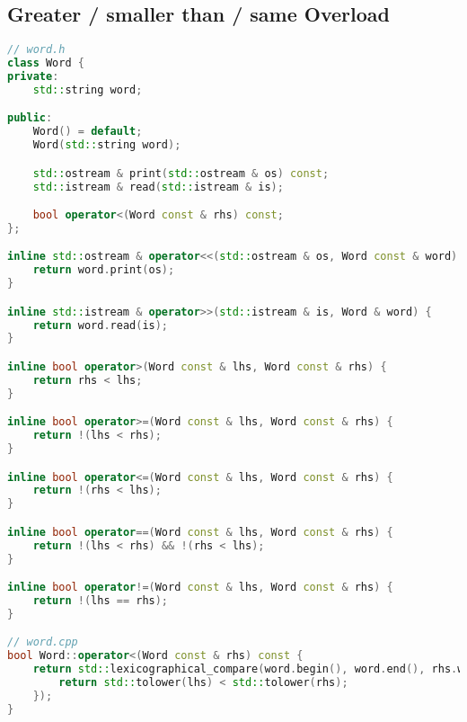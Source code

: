 \subsection{Greater / smaller than / same Overload}
\begin{lstlisting}[language=C++]
// word.h
class Word {
private:
	std::string word;

public:
	Word() = default;
	Word(std::string word);

	std::ostream & print(std::ostream & os) const;
	std::istream & read(std::istream & is);

	bool operator<(Word const & rhs) const;
};

inline std::ostream & operator<<(std::ostream & os, Word const & word) {
	return word.print(os);
}

inline std::istream & operator>>(std::istream & is, Word & word) {
	return word.read(is);
}

inline bool operator>(Word const & lhs, Word const & rhs) {
	return rhs < lhs;
}

inline bool operator>=(Word const & lhs, Word const & rhs) {
	return !(lhs < rhs);
}

inline bool operator<=(Word const & lhs, Word const & rhs) {
	return !(rhs < lhs);
}

inline bool operator==(Word const & lhs, Word const & rhs) {
	return !(lhs < rhs) && !(rhs < lhs);
}

inline bool operator!=(Word const & lhs, Word const & rhs) {
	return !(lhs == rhs);
}

// word.cpp
bool Word::operator<(Word const & rhs) const {
	return std::lexicographical_compare(word.begin(), word.end(), rhs.word.begin() ,rhs.word.end(), [](char lhs, char rhs) {
		return std::tolower(lhs) < std::tolower(rhs);
	});
}
\end{lstlisting}


\break







